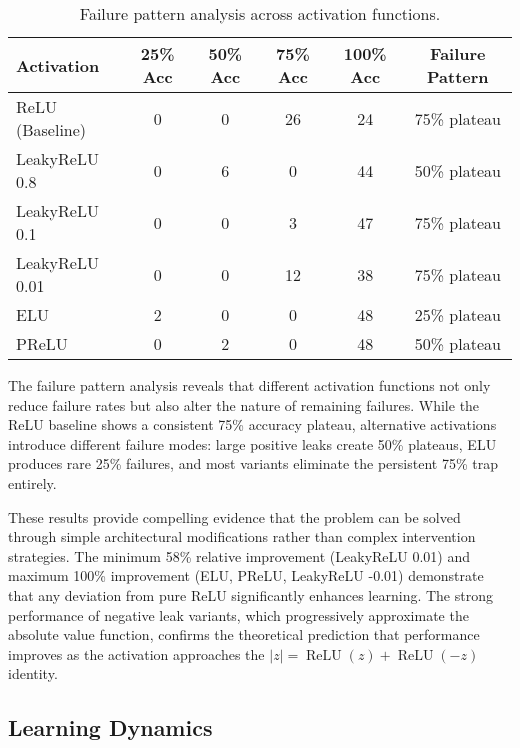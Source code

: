 \begin{table}[ht]
\centering
\caption{Failure pattern analysis across activation functions.}
\label{tab:relu1-activation-failures}
\begin{tabular}{lccccc}
\toprule
Activation & 25\% Acc & 50\% Acc & 75\% Acc & 100\% Acc & Failure Pattern \\
\midrule
ReLU (Baseline) & 0 & 0 & 26 & 24 & 75\% plateau \\
LeakyReLU 0.8 & 0 & 6 & 0 & 44 & 50\% plateau \\
LeakyReLU 0.1 & 0 & 0 & 3 & 47 & 75\% plateau \\
LeakyReLU 0.01 & 0 & 0 & 12 & 38 & 75\% plateau \\
ELU & 2 & 0 & 0 & 48 & 25\% plateau \\
PReLU & 0 & 2 & 0 & 48 & 50\% plateau \\
\bottomrule
\end{tabular}
\end{table}

The failure pattern analysis reveals that different activation functions not only reduce failure rates but also alter the nature of remaining failures. While the ReLU baseline shows a consistent 75\% accuracy plateau, alternative activations introduce different failure modes: large positive leaks create 50\% plateaus, ELU produces rare 25\% failures, and most variants eliminate the persistent 75\% trap entirely.

These results provide compelling evidence that the problem can be solved through simple architectural modifications rather than complex intervention strategies. The minimum 58\% relative improvement (LeakyReLU 0.01) and maximum 100\% improvement (ELU, PReLU, LeakyReLU -0.01) demonstrate that any deviation from pure ReLU significantly enhances learning. The strong performance of negative leak variants, which progressively approximate the absolute value function, confirms the theoretical prediction that performance improves as the activation approaches the $|z| = \operatorname{ReLU}(z) + \operatorname{ReLU}(-z)$ identity.


\subsection*{Learning Dynamics}

